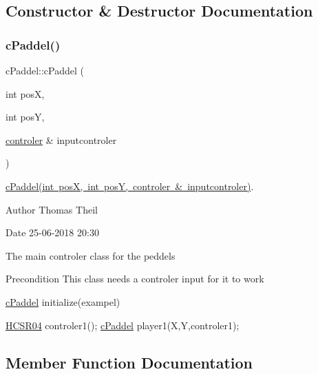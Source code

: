 \subsection{Constructor \& Destructor Documentation}
\mbox{\label{classc_paddel_ac907920de815a71e07e129e511f13db4}} 
\subsubsection{\texorpdfstring{c\+Paddel()}{cPaddel()}}
{\footnotesize\ttfamily c\+Paddel\+::c\+Paddel (\begin{DoxyParamCaption}\item[{int}]{posX,  }\item[{int}]{posY,  }\item[{\mbox{\hyperlink{classcontroler}{controler}} \&}]{inputcontroler }\end{DoxyParamCaption})}



\mbox{\hyperlink{classc_paddel_ac907920de815a71e07e129e511f13db4}{c\+Paddel(int pos\+X, int pos\+Y, controler \& inputcontroler)}}. 

\begin{DoxyAuthor}{Author}
Thomas Theil 
\end{DoxyAuthor}
\begin{DoxyDate}{Date}
25-\/06-\/2018 20\+:30
\end{DoxyDate}
The main controler class for the peddels

\begin{DoxyPrecond}{Precondition}
This class needs a controler input for it to work 
\end{DoxyPrecond}
\mbox{\hyperlink{classc_paddel}{c\+Paddel}} initialize(exampel) 
\begin{DoxyCode}
 \mbox{\hyperlink{class_h_c_s_r04}{HCSR04}} controler1();
\mbox{\hyperlink{classc_paddel}{cPaddel}} player1(X,Y,controler1);
\end{DoxyCode}
 

\subsection{Member Function Documentation}
\mbox{\label{classc_paddel_aaa833a367eab3cc275d7b67b4c3b68e4}} 
